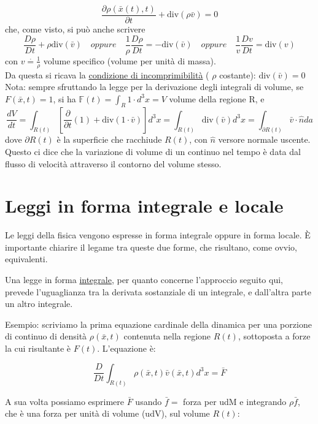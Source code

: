 \documentclass[a4paper,11pt]{report}
\newcommand{\eacc}{È }
\newcommand{\defeq}{\overset{\cdot}{=}}
\newcommand{\x}{\bar{x}}
\newcommand{\xt}{\bar{x}(t)}
\newcommand{\vel}{\bar{v}}
\begin{document}
		\begin{equation}
			 \dfrac{\partial \rho(\xt,t)}{\partial t} + \mathrm{ div}\left(\rho \vel\right) = 0
		\end{equation}
		che, come visto, si può anche scrivere
		$$
		\dfrac{D\rho}{Dt} + \rho\mathrm{ div}(\vel) \quad oppure \quad \dfrac{1}{\rho}\dfrac{D\rho}{Dt} = -\mathrm{ div}(\vel) \quad oppure \quad \dfrac{1}{v}\dfrac{Dv}{Dt} = \mathrm{ div}(v)
		$$
		con $v\defeq\frac{1}{\rho}$ volume specifico (volume per unità di massa).\\
		Da questa si ricava la \underline{condizione di incomprimibilità} ( $\rho$ costante): $\mathrm{ div}(\vel) = 0$\\
		
		Nota: sempre sfruttando la legge per la derivazione degli integrali di volume, se $F(\x,t)=1$, si ha $\mathbb{F}(t) = \int_R 1\cdot d^3x = V$ volume della regione R, e
		$$
		\dfrac{dV}{dt} = \int_{R(t)}\left[\dfrac{\partial}{\partial t}(1) + \mathrm{ div}(1\cdot \vel)\right] d^3x = \int_{R(t)}\mathrm{div}(\vel) d^3x = \int_{\partial R(t)} \vel\cdot \hat{n} da
		$$
		dove $\partial R(t)$ è la superficie che racchiude $R(t)$, con $\hat{n}$ versore normale uscente.
		Questo ci dice che la variazione di volume di un continuo nel tempo è data dal flusso di velocità attraverso il contorno del volume stesso.

	
	\section{Leggi in forma integrale e locale}
		Le leggi della fisica vengono espresse in forma integrale oppure in forma locale. \eacc importante chiarire il legame tra queste due forme, che risultano, come ovvio, equivalenti.
		
		Una legge in forma \underline{integrale}, per quanto concerne l'approccio seguito qui, prevede l'uguaglianza tra la derivata sostanziale di un integrale, e dall'altra parte un altro integrale.
		
		Esempio: scriviamo la prima equazione cardinale della dinamica per una porzione di continuo di densità $\rho(\x,t)$ contenuta nella regione $R(t)$, sottoposta a forze la cui risultante è $F(t)$. 
		L'equazione è:
		
		$$
		\dfrac{D}{Dt}\int_{R(t)}\rho(\x,t)\vel(\x,t)d^3x = \bar{F}
		$$
		
		A sua volta possiamo esprimere $\bar{F}$ usando $\bar{f} = $ forza per udM e integrando $\rho \bar{f}$, che è una forza per unità di volume (udV), sul volume $R(t)$:
		
\end{document}

